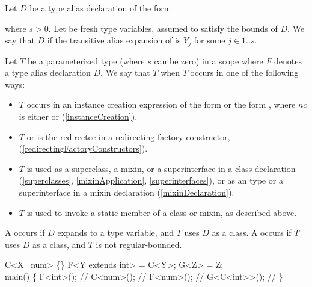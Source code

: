 \documentclass[makeidx]{article}
\begin{document}
{\LMHash{}%
%
Let $D$ be a type alias declaration of the form

\noindent
{}

\noindent
where $s > 0$.
%
Let  be fresh type variables,
assumed to satisfy the bounds of $D$.
We say that $D$
if the transitive alias expansion of
is $Y_j$ for some $j \in 1 .. s$.

\LMHash{}%
%
Let $T$ be a parameterized type 
(where $s$ can be zero)
in a scope where $F$ denotes a type alias declaration $D$.
We say that $T$
when $T$ occurs in one of the following ways:

\begin{itemize}
\item
  $T$ occurs in an instance creation expression of the form
   or the form ,
  where $nc$ is either \NEW{} or \CONST{}
  (\ref{instanceCreation}).
\item
  $T$ or  is the redirectee in a redirecting factory constructor,
  (\ref{redirectingFactoryConstructors}).
\item
  $T$ is used as a superclass, a mixin, or a superinterface
  in a class declaration
  (\ref{superclasses}, \ref{mixinApplication}, \ref{superinterfaces}),
  or as an \ON{} type or a superinterface in a mixin declaration
  (\ref{mixinDeclaration}).
\item
  $T$ is used to invoke a static member of a class or mixin,
  as described above.
\end{itemize}

\LMHash{}%
A  occurs if $D$ expands to a type variable,
and $T$ uses $D$ as a class.
A  occurs if $T$ uses $D$ as a class,
and $T$ is not regular-bounded.

\begin{dartCode}
\CLASS{} C<X \EXTENDS\ num> \{\}
\TYPEDEF{} F<Y extends int> = C<Y>;
\TYPEDEF{} G<Z> = Z;
\\
\VOID{} main() \{
  F<int>(); // 
  C<num>(); // 
  F<num>(); // 
  G<C<int>{}>(); // 
\}
\end{dartCode}

}
\end{document}
